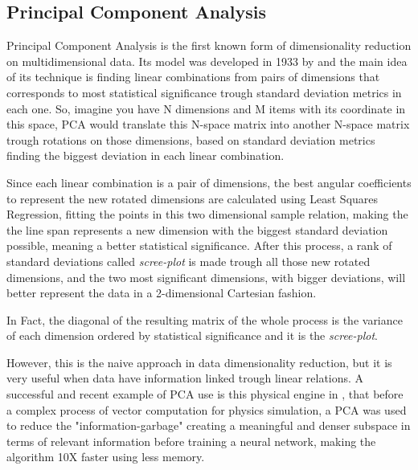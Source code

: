 \documentclass[ecp,tc,english]{iiufrgs}
\begin{document}
        
    
        \subsection{Principal Component Analysis} 
        Principal Component Analysis is the first known form of dimensionality reduction on multidimensional data.
        Its model was developed in 1933 by \cite{hotelling:33} and the main idea of its technique is finding linear combinations from pairs of dimensions that corresponds to most statistical significance trough standard deviation metrics in each one.
        So, imagine you have N dimensions and M items with its coordinate in this space, PCA would translate this N-space matrix into another N-space matrix trough rotations on those dimensions, based on standard deviation metrics finding the biggest deviation in each linear combination. 

        Since each linear combination is a pair of dimensions, the best angular coefficients to represent the new rotated dimensions are calculated using Least Squares Regression, fitting the points in this two dimensional sample relation, making the the line span represents a new dimension with the biggest standard deviation possible, meaning a better statistical significance.
        After this process, a rank of standard deviations called \textit{scree-plot} is made trough all those new rotated dimensions, and the two most significant dimensions, with bigger deviations, will better represent the data in a 2-dimensional Cartesian fashion.

        In Fact, the diagonal of the resulting matrix of the whole process is the variance of each dimension ordered by statistical significance and it is the \textit{scree-plot}.

        However, this is the naive approach in data dimensionality reduction, but it is very useful when data have information linked trough linear relations.
        A successful and recent example of PCA use is this physical engine in \cite{10.1145/3309486.3340245}, that before a complex process of vector computation for physics simulation, a PCA was used to reduce the "information-garbage" creating a meaningful and denser subspace in terms of relevant information before training a neural network, making the algorithm 10X faster using less memory.
        
\end{document}
